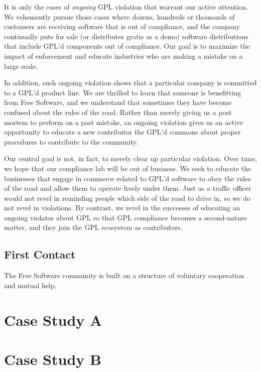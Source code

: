 \documentclass[12pt]{report}
\begin{document}
It is only the cases of {\em ongoing\/} GPL violation that warrant our
active attention.  We vehemently pursue those cases where dozens, hundreds
or thousands of customers are receiving software that is out of
compliance, and the company continually puts for sale (or distributes
gratis as a demo) software distributions that include GPL'd components out
of compliance.  Our goal is to maximize the impact of enforcement and
educate industries who are making a mistake on a large scale.

In addition, such ongoing violation shows that a particular company is
committed to a GPL'd product line.  We are thrilled to learn that someone
is benefitting from Free Software, and we understand that sometimes they
have become confused about the rules of the road.  Rather than merely
giving us a post mortem to perform on a past mistake, an ongoing violation
gives us an active opportunity to educate a new contributor the GPL'd
commons about proper procedures to contribute to the community.

Our central goal is not, in fact, to merely clear up particular violation.
Over time, we hope that our compliance lab will be out of business.  We
seek to educate the businesses that engage in commerce related to GPL'd
software to obey the rules of the road and allow them to operate freely
under them.  Just as a traffic officer would not revel in reminding people
which side of the road to drive in, so we do not revel in violations.  By
contrast, we revel in the successes of educating an ongoing violator about
GPL so that GPL compliance becomes a second-nature matter, and they join
the GPL ecosystem as contributors.

\section{First Contact}

The Free Software community is built on a structure of voluntary
cooperation and mutual help.



\chapter{Case Study A}

\chapter{Case Study B}
\end{document}
